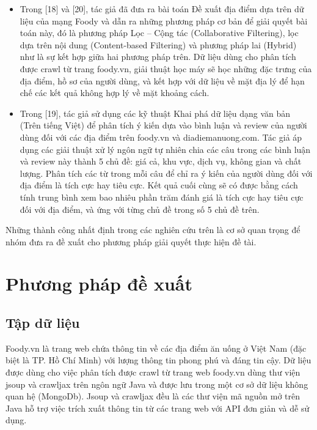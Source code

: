 \documentclass[12pt]{extarticle}
\begin{document}
			\begin{itemize}
				\item Trong [18] và [20], tác giả đã đưa ra bài toán Đề xuất địa điểm dựa trên dữ liệu của mạng Foody và dẫn ra những phương pháp cơ bản để giải quyết bài toán này, đó là phương pháp Lọc – Cộng tác (Collaborative Filtering), lọc dựa trên nội dung (Content-based Filtering) và phương pháp lai (Hybrid) như là sự kết hợp giữa hai phương pháp trên. Dữ liệu dùng cho phân tích được crawl từ trang foody.vn, giải thuật học máy sẽ học những đặc trưng của địa điểm, hồ sơ của người dùng, và kết hợp với dữ liệu về mặt địa lý để hạn chế các kết quả không hợp lý về mặt khoảng cách. 
				\item Trong [19], tác giả sử dụng các kỹ thuật Khai phá dữ liệu dạng văn bản (Trên tiếng Việt) để phân tích ý kiến dựa vào bình luận và review của người dùng đối với các địa điểm trên foody.vn và diadiemanuong.com. Tác giả áp dụng các giải thuật xử lý ngôn ngữ tự nhiên chia các câu trong các bình luận và review này thành 5 chủ đề: giá cả, khu vực, dịch vụ, không gian và chất lượng. Phân tích các từ trong mỗi câu để chỉ ra ý kiến của người dùng đối với địa điểm là tích cực hay tiêu cực. Kết quả cuối cùng sẽ có được bằng cách tính trung bình xem bao nhiêu phần trăm đánh giá là tích cực hay tiêu cực đối với địa điểm, và ứng với từng chủ đề trong số 5 chủ đề trên.   
				\end{itemize}
			\par Những thành công nhất định trong các nghiên cứu trên là cơ sở quan trọng để nhóm đưa ra đề xuất cho phương pháp giải quyết thực hiện đề tài.

	\section{Phương pháp đề xuất}								
		\subsection{Tập dữ liệu}
			\par Foody.vn là trang web chứa thông tin về các địa điểm ăn uống ở Việt Nam (đặc biệt là TP. Hồ Chí Minh) với lượng thông tin phong phú và đáng tin cậy. Dữ liệu được dùng cho việc phân tích được crawl từ trang web foody.vn dùng thư viện jsoup và crawljax trên ngôn ngữ Java và được lưu trong một cơ sở dữ liệu không quan hệ (MongoDb). Jsoup và crawljax đều là các thư viện mã nguồn mở trên Java hỗ trợ việc trích xuất thông tin từ các trang web với API đơn giản và dễ sử dụng.
					
\end{document}
